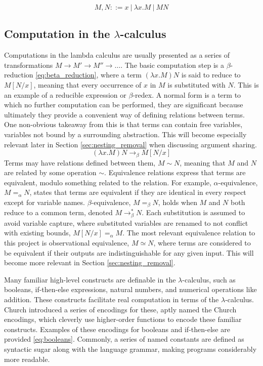 \documentclass[12pt,a4paper]{report}
\theoremstyle{definition}
\theoremstyle{definition}
\theoremstyle{remark}
\begin{document}
\begin{equation}\label{eq:lambda_calc}
    M,N ::= x\ |\ \lambda x.M\ |\ MN
\end{equation}
\subsection{Computation in the \texorpdfstring{$\lambda$}{lambda}-calculus}

Computations in the lambda calculus are usually presented as a series of transformations $M \rightarrow M' \rightarrow M'' \rightarrow \ldots$. The basic computation step is a $\beta$-reduction \eqref{eq:beta_reduction}, where a term $(\lambda x.M)N$ is said to reduce to $M[N/x]$, meaning that every occurrence of $x$ in $M$ is substituted with $N$. This is an example of a reducible expression or $\beta$-redex. A normal form is a term to which no further computation can be performed, they are significant because ultimately they provide a convenient way of defining relations between terms. One non-obvious takeaway from this is that terms can contain free variables, variables not bound by a surrounding abstraction. This will become especially relevant later in Section \ref{sec:nesting_removal} when discussing argument sharing.
\begin{equation}\label{eq:beta_reduction}
   (\lambda x.M)N \rightarrow_{\beta} M[N/x]
\end{equation}
Terms may have relations defined between them, $M \sim N$, meaning that $M$ and $N$ are related by some operation $\sim$. Equivalence relations express that terms are equivalent, modulo something related to the relation. For example, $\alpha$-equivalence, $M =_{\alpha} N$, states that terms are equivalent if they are identical in every respect except for variable names. $\beta$-equivalence, $M =_{\beta} N$, holds when $M$ and $N$ both reduce to a common term, denoted $M \rightarrow_{\beta}^* N$. Each substitution is assumed to avoid variable capture, where substituted variables are renamed to not conflict with existing bounds, $M[N/x] =_{\alpha} M$. The most relevant equivalence relation to this project is observational equivalence, $M \simeq N$, where terms are considered to be equivalent if their outputs are indistinguishable for any given input. This will become more relevant in Section \ref{sec:nesting_removal}.

Many familiar high-level constructs are definable in the $\lambda$-calculus, such as booleans, if-then-else expressions, natural numbers, and numerical operations like addition. These constructs facilitate real computation in terms of the $\lambda$-calculus. Church introduced a series of encodings for these, aptly named the Church encodings, which cleverly use higher-order functions to encode these familiar constructs. Examples of these encodings for booleans and if-then-else are provided \eqref{eq:booleans}. Commonly, a series of named constants are defined as syntactic sugar along with the language grammar, making programs considerably more readable. 
\end{document}

